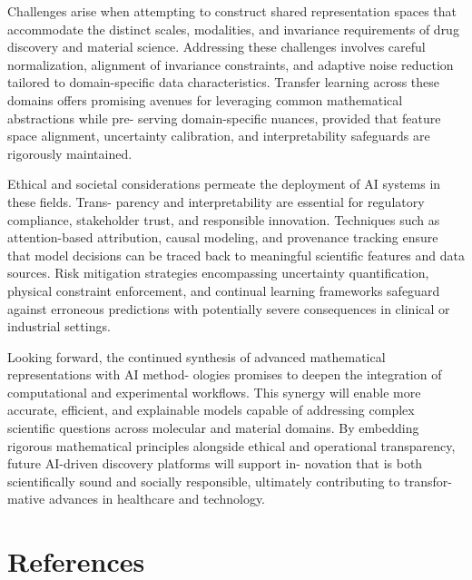 \documentclass[
]{article}
\begin{document}
Challenges arise when attempting to construct shared representation
spaces that accommodate the distinct scales, modalities, and invariance
requirements of drug discovery and material science. Addressing these
challenges involves careful normalization, alignment of invariance
constraints, and adaptive noise reduction tailored to domain-specific
data characteristics. Transfer learning across these domains offers
promising avenues for leveraging common mathematical abstractions while
pre- serving domain-specific nuances, provided that feature space
alignment, uncertainty calibration, and interpretability safeguards are
rigorously maintained.

Ethical and societal considerations permeate the deployment of AI
systems in these fields. Trans- parency and interpretability are
essential for regulatory compliance, stakeholder trust, and responsible
innovation. Techniques such as attention-based attribution, causal
modeling, and provenance tracking ensure that model decisions can be
traced back to meaningful scientific features and data sources. Risk
mitigation strategies encompassing uncertainty quantification, physical
constraint enforcement, and continual learning frameworks safeguard
against erroneous predictions with potentially severe consequences in
clinical or industrial settings.

Looking forward, the continued synthesis of advanced mathematical
representations with AI method- ologies promises to deepen the
integration of computational and experimental workflows. This synergy
will enable more accurate, efficient, and explainable models capable of
addressing complex scientific questions across molecular and material
domains. By embedding rigorous mathematical principles alongside ethical
and operational transparency, future AI-driven discovery platforms will
support in- novation that is both scientifically sound and socially
responsible, ultimately contributing to transfor- mative advances in
healthcare and technology.

\section{References}\label{references}
\end{document}
